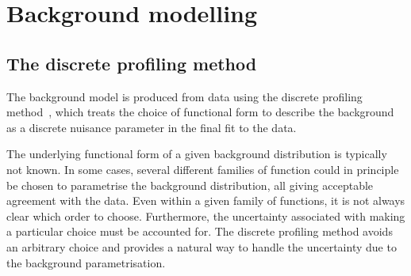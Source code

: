 

\section{Background modelling}
\label{model:sec:background_model}
\subsection{The discrete profiling method}

The background model is produced from data using the discrete profiling method~\cite{DiscreteProfiling}, which treats the choice of functional form to describe the background as a discrete nuisance parameter in the final \NLL fit to the data. 

The underlying functional form of a given background distribution is typically not known. In some cases, several different families of function could in principle be chosen to parametrise the background distribution, all giving acceptable agreement with the data. Even within a given family of functions, it is not always clear which order to choose. Furthermore, the uncertainty associated with making a particular choice must be accounted for. %
The discrete profiling method avoids an arbitrary choice and provides a natural way to handle the uncertainty due to the background parametrisation.

